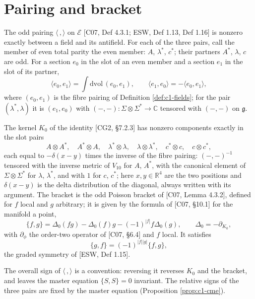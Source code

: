 \section{Pairing and bracket}

\begin{definition}
\label{def:c1-pairing}
The odd pairing $\langle\,,\rangle$ on $\mathscr E$ [C07, Def 4.3.1; ESW, Def 1.13, Def 1.16] is nonzero exactly between a field and its antifield. For each of the three pairs, call the member of even total parity the even member: $A$, $\lambda^*$, $c^*$; their partners $A^*$, $\lambda$, $c$ are odd. For a section $e_0$ in the slot of an even member and a section $e_1$ in the slot of its partner,
\[
\langle e_0,e_1\rangle=\int\mathrm{dvol}\,(e_0,e_1),\qquad \langle e_1,e_0\rangle=-\langle e_0,e_1\rangle ,
\]
where $(e_0,e_1)$ is the fibre pairing of Definition \ref{def:c1-fields}; for the pair $(\lambda^*,\lambda)$ it is $(e_1,e_0)$ with $(-,-)\colon\Sigma\otimes\Sigma^*\to\mathbb C$ tensored with $(-,-)$ on $\mathfrak g$.
\end{definition}

\begin{definition}
\label{def:c1-bracket}
The kernel $K_0$ of the identity [CG2, §7.2.3] has nonzero components exactly in the slot pairs
\[
A\otimes A^*,\quad A^*\otimes A,\quad \lambda^*\otimes\lambda,\quad \lambda\otimes\lambda^*,\quad c^*\otimes c,\quad c\otimes c^*,
\]
each equal to $-\delta(x-y)$ times the inverse of the fibre pairing: $(-,-)^{-1}$ tensored with the inverse metric of $V_{10}$ for $A$, $A^*$, with the canonical element of $\Sigma\otimes\Sigma^*$ for $\lambda$, $\lambda^*$, and with $1$ for $c$, $c^*$; here $x,y\in\mathbb R^4$ are the two positions and $\delta(x-y)$ is the delta distribution of the diagonal, always written with its argument. The bracket is the odd Poisson bracket of [C07, Lemma 4.3.2], defined for $f$ local and $g$ arbitrary; it is given by the formula of [C07, §10.1] for the manifold a point,
\[
\{f,g\}=\Delta_0(fg)-\Delta_0(f)g-(-1)^{|f|}f\Delta_0(g),\qquad \Delta_0=-\partial_{K_0},
\]
with $\partial_\phi$ the order-two operator of [C07, §6.4] and $f$ local. It satisfies
\[
\{g,f\}=(-1)^{|f||g|}\{f,g\},
\]
the graded symmetry of [ESW, Def 1.15].
\end{definition}

\begin{remark}
The overall sign of $\langle\,,\rangle$ is a convention: reversing it reverses $K_0$ and the bracket, and leaves the master equation $\{S,S\}=0$ invariant. The relative signs of the three pairs are fixed by the master equation (Proposition \ref{prop:c1-cme}).
\end{remark}

